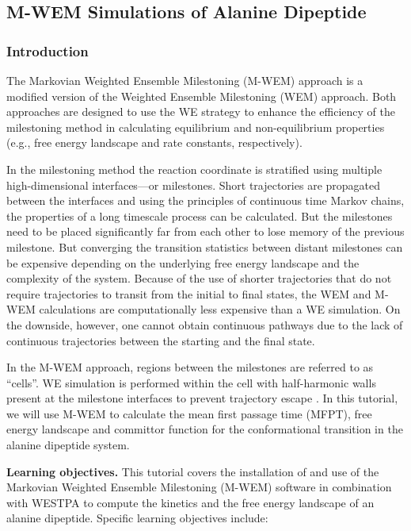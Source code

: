 \subsection{M-WEM Simulations of Alanine Dipeptide}

\subsubsection{Introduction}

The Markovian Weighted Ensemble Milestoning (M-WEM) approach \citep{Ray2022Markovian} is a modified version of the Weighted Ensemble Milestoning (WEM) \citep{Ray2020Kinetics,Ray2020Weighted} approach. 
Both approaches are designed to use the WE strategy to enhance the efficiency of the milestoning method in calculating equilibrium and non-equilibrium properties (e.g., free energy landscape and rate constants, respectively). 

In the milestoning method \citep{Faradjian2004Computing,West2007Extending} the reaction coordinate is stratified using multiple high-dimensional interfaces---or milestones. 
Short trajectories are propagated between the interfaces and using the principles of continuous time Markov chains, the properties of a long timescale process can be calculated. 
But the milestones need to be placed significantly far from each other to lose memory of the previous milestone. 
But converging the transition statistics between distant milestones can be expensive depending on the underlying free energy landscape and the complexity of the system. 
Because of the use of shorter trajectories that do not require trajectories to transit from the initial to final states, the WEM and M-WEM calculations are computationally less expensive than a WE simulation. 
On the downside, however, one cannot obtain continuous pathways due to the lack of continuous trajectories between the starting and the final state. 

In the M-WEM approach, regions between the milestones are referred to as “cells”.
WE simulation is performed within the cell with half-harmonic walls present at the milestone interfaces to prevent trajectory escape \citep{Vanden-Eijnden2009Markovian, Maragliano2009Free, Ray2022Markovian}. 
In this tutorial, we will use M-WEM to calculate the mean first passage time (MFPT), free energy landscape and committor function for the conformational transition in the alanine dipeptide system.

\textbf{Learning objectives.} This tutorial covers the installation of and use of the Markovian Weighted Ensemble Milestoning (M-WEM) software in combination with WESTPA to compute the kinetics and the free energy landscape of an alanine dipeptide. 
Specific learning objectives include:

